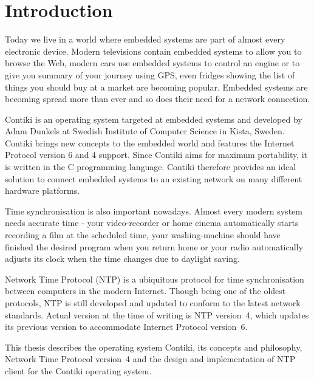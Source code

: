 
\chapter{Introduction}
Today we live in a world where embedded systems are part of almost every electronic device.
Modern televisions contain embedded systems to allow you to browse the Web,
modern cars use embedded systems to control an engine or to give you summary
of your journey using GPS, even fridges showing the list of things you should buy at a market are becoming popular.
Embedded systems are becoming spread more than ever and so does
their need for a network connection.

Contiki is an operating system targeted at embedded systems and
developed by Adam Dunkels at Swedish Institute of Computer Science in Kista, Sweden.
Contiki brings new concepts to the embedded world and features the
Internet Protocol version 6 and 4 support.
Since Contiki aims for maximum portability, it is written in the C programming language.
Contiki therefore provides an ideal solution to connect
embedded systems to an existing network on many different hardware platforms.

Time synchronisation is also important nowadays.
Almost every modern system needs accurate time -
your video-recorder or home cinema automatically starts recording a film at the scheduled time,
your washing-machine should have finished the
desired program when you return home or your radio automatically adjusts its clock when the time changes
due to daylight saving.

Network Time Protocol (NTP) is a ubiquitous protocol for time synchronisation between computers in the modern Internet.
Though being one of the oldest protocols, NTP is still developed and updated to conform to the latest
network standards. Actual version at the time of writing is NTP version~4, which updates its previous version to
accommodate Internet Protocol version~6.

This thesis describes the operating system Contiki, its concepts and philosophy,
Network Time Protocol version~4 and the design and implementation of NTP client for the Contiki operating system.








